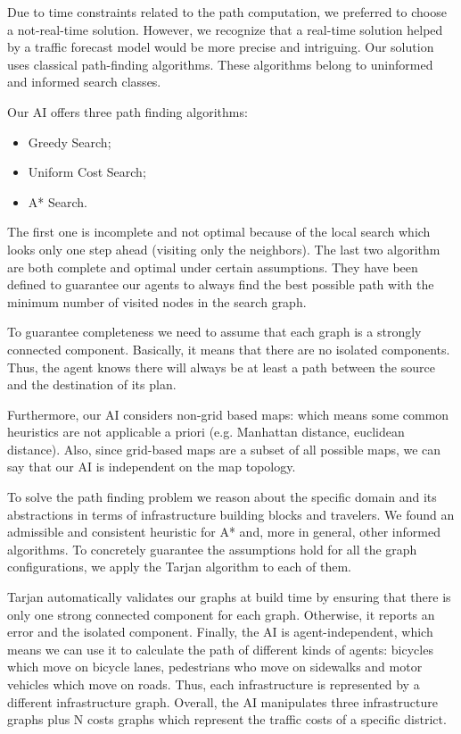 
Due to time constraints related to the path computation, we preferred to
choose a not-real-time solution. However, we recognize that a real-time solution
helped by a traffic forecast model would be more precise and intriguing.
Our solution uses classical path-finding algorithms. These algorithms
belong to uninformed and informed search classes.

Our AI offers three path finding algorithms:
\begin{itemize}
  \item Greedy Search;
  \item Uniform Cost Search;
  \item A* Search.
\end{itemize}

The first one is incomplete and not optimal because of the local search which
looks only one step ahead (visiting
only the neighbors). The last two algorithm are both complete and optimal
under certain assumptions. They have been defined
to guarantee our agents to always find the best possible path with
the minimum number of visited nodes in the search graph.


To guarantee completeness we need to assume that each graph is a strongly
connected component. Basically, it means that there are no isolated
components. Thus, the agent knows there will always be at least a path between
the source and the destination of its plan. %

Furthermore, our AI considers non-grid based maps: which means some common
heuristics are not applicable a priori (e.g. Manhattan distance, euclidean
distance). Also, since grid-based maps are a subset of all possible maps, we
can say that our AI is independent on the map topology.

To solve the path finding problem we reason about the specific domain and its
abstractions in terms of infrastructure building blocks and travelers. We
found an admissible and consistent heuristic for A* and, more in general, other
informed algorithms. To concretely guarantee the assumptions hold for all the
graph configurations, we apply the Tarjan algorithm to each of them.

Tarjan automatically validates our graphs at build time by ensuring that there
is only one strong connected component for each graph. Otherwise, it reports
an error and the isolated component.
Finally, the AI is agent-independent, which means we can use it to calculate
the path of different kinds of agents: bicycles which move on bicycle lanes,
pedestrians who move on sidewalks and motor vehicles which move on roads.
Thus, each infrastructure is represented by a different infrastructure graph.
Overall, the AI manipulates three infrastructure graphs plus N costs graphs
which represent the traffic costs of a specific district.


